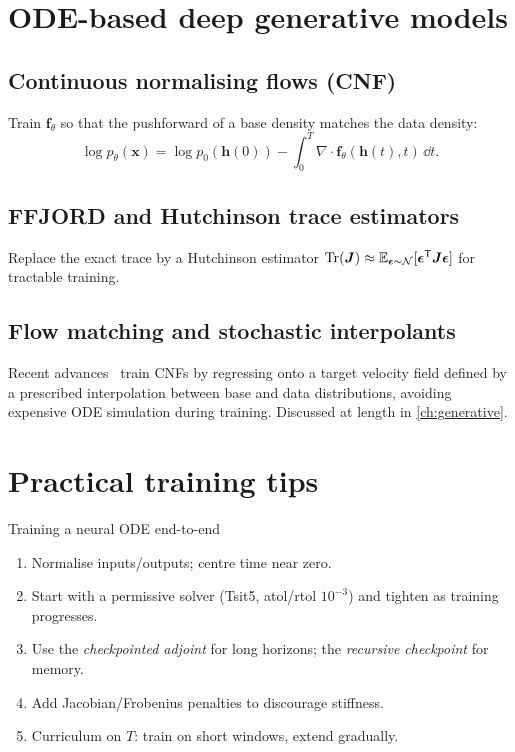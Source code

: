 \section{ODE-based deep generative models}
\subsection{Continuous normalising flows (CNF)}
Train $\bm{f}_\theta$ so that the pushforward of a base density
matches the data density:
\begin{equation}
\log p_\theta(\bm{x})=\log p_0(\bm{h}(0)) - \int_0^T \nabla\!\cdot\bm{f}_\theta(\bm{h}(t),t)\,\dd t.
\end{equation}
\subsection{FFJORD and Hutchinson trace estimators}
Replace the exact trace by a Hutchinson estimator
$\operatorname{Tr}(\bm{J})\approx \operatorname{\mathbb{E}}_{\bm{\epsilon}\sim\mathcal{N}}[\bm{\epsilon}^{\mathsf{T}}\bm{J}\bm{\epsilon}]$ for tractable training.

\subsection{Flow matching and stochastic interpolants}
Recent advances~\cite{lipman2023flowmatching,albergo2023interpolants}
train CNFs by regressing onto a target velocity field defined by a
prescribed interpolation between base and data distributions, avoiding
expensive ODE simulation during training. Discussed at length in
\cref{ch:generative}.

\section{Practical training tips}
\begin{recipe}{Training a neural ODE end-to-end}
\begin{enumerate}
\item Normalise inputs/outputs; centre time near zero.
\item Start with a permissive solver (Tsit5, atol/rtol $10^{-3}$) and
tighten as training progresses.
\item Use the \emph{checkpointed adjoint} for long horizons; the
\emph{recursive checkpoint} for memory.
\item Add Jacobian/Frobenius penalties to discourage stiffness.
\item Curriculum on $T$: train on short windows, extend gradually.
\end{enumerate}
\end{recipe}

